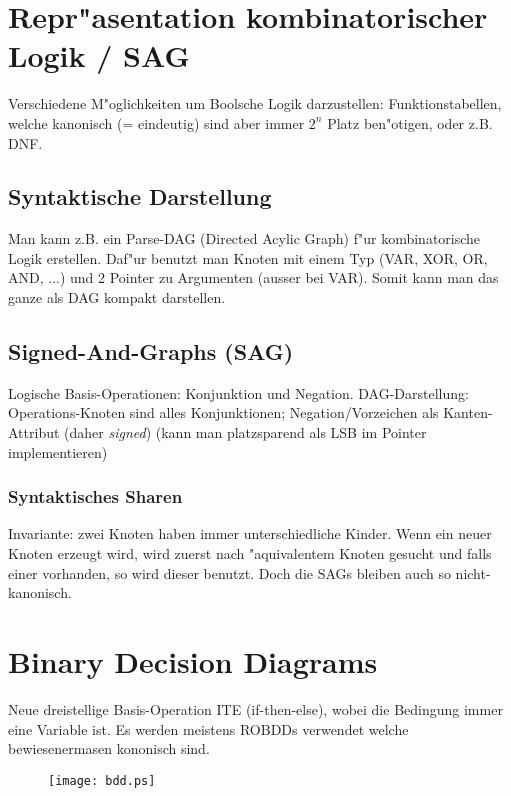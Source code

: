 \documentclass[german, 10pt, a4paper, twocolumn]{scrartcl}
\theoremstyle{definition}
\begin{document}
\section{Repr"asentation kombinatorischer Logik / SAG}

Verschiedene M"oglichkeiten um Boolsche Logik darzustellen: Funktionstabellen, welche kanonisch (= eindeutig) sind aber immer $2^n$ Platz ben"otigen, oder z.B. DNF.

\subsection{Syntaktische Darstellung}

Man kann z.B. ein Parse-DAG (Directed Acylic Graph) f"ur kombinatorische Logik erstellen. Daf"ur benutzt man Knoten mit einem Typ (VAR, XOR, OR, AND, ...) und 2 Pointer zu Argumenten (ausser bei VAR). Somit kann man das ganze als DAG kompakt darstellen.

\subsection{Signed-And-Graphs (SAG)}

Logische Basis-Operationen: Konjunktion und Negation. DAG-Darstellung: Operations-Knoten sind alles Konjunktionen; Negation/Vorzeichen als Kanten-Attribut (daher \textit{signed}) (kann man platzsparend als LSB im Pointer implementieren)

\subsubsection{Syntaktisches Sharen}

Invariante: zwei Knoten haben immer unterschiedliche Kinder. Wenn ein neuer Knoten erzeugt wird, wird zuerst nach "aquivalentem Knoten gesucht und falls einer vorhanden, so wird dieser benutzt. Doch die SAGs bleiben auch so nicht-kanonisch.

\section{Binary Decision Diagrams}

Neue dreistellige Basis-Operation ITE (if-then-else), wobei die Bedingung immer eine Variable ist. Es werden meistens ROBDDs verwendet welche bewiesenermasen kononisch sind.

\begin{figure}[htb]
	\begin{center}
		\texttt{[image: bdd.ps]}
	\end{center}
\end{figure}
\end{document}
